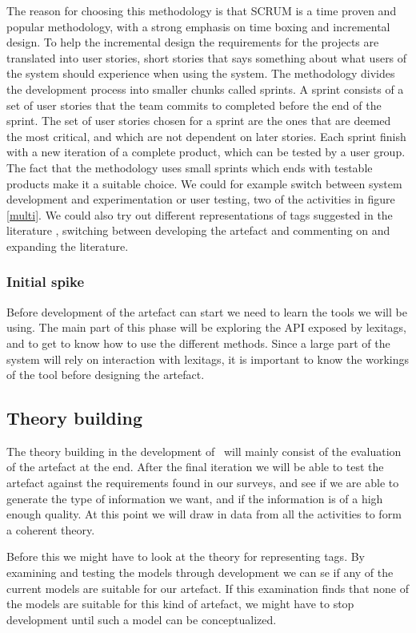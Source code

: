 The reason for choosing this methodology is that SCRUM is a time proven and popular methodology, with a strong emphasis on time boxing and incremental design.
To help the incremental design the requirements for the projects are translated into user stories,
short stories that says something about what users of the system should experience when using the system.
The methodology divides the development process into smaller chunks called sprints. 
A sprint consists of a set of user stories that the team commits to completed before the end of the sprint.
The set of user stories chosen for a sprint are the ones that are deemed the most critical, and which are not dependent on later stories. 
Each sprint finish with a new iteration of a complete product, which can be tested by a user group.
The fact that the methodology uses small sprints which ends with testable products make it a suitable choice.
We could for example switch between system development and experimentation or user testing, two of the activities in figure \ref{multi}.
We could also try out different representations of tags suggested in the literature \citep{Mika2005,Gruber2007,Scerri2008}, 
switching between developing the artefact and commenting on and expanding the literature.

\subsubsection{Initial spike}
Before development of the artefact can start we need to learn the tools we will be using. 
The main part of this phase will be exploring the API exposed by lexitags, and to get to know how to use the different methods.
Since a large part of the system will rely on interaction with lexitags, it is important to know the workings of the tool before designing the artefact.

\subsection{Theory building}
The theory building in the development of \theartefact\ will mainly consist of the evaluation of the artefact at the end.
After the final iteration we will be able to test the artefact against the requirements found in our surveys, 
and see if we are able to generate the type of information we want, and if the information is of a high enough quality.
At this point we will draw in data from all the activities to form a coherent theory.

Before this we might have to look at the theory for representing tags.
By examining and testing the models through development we can se if any of the current models are suitable for our artefact.
If this examination finds that none of the models are suitable for this kind of artefact, we might have to stop development
until such a model can be conceptualized.







